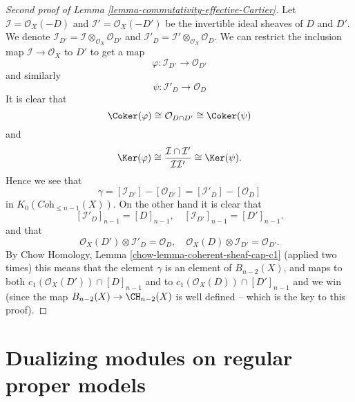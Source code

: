\begin{proof}[Second proof of Lemma \ref{lemma-commutativity-effective-Cartier}]
Let $\mathcal{I} = \mathcal{O}_X(-D)$ and
$\mathcal{I}' = \mathcal{O}_X(-D')$ be the invertible
ideal sheaves of $D$ and $D'$.
We denote
$\mathcal{I}_{D'} = \mathcal{I} \otimes_{\mathcal{O}_X} \mathcal{O}_{D'}$
and
$\mathcal{I}'_D = \mathcal{I}' \otimes_{\mathcal{O}_X} \mathcal{O}_D$.
We can restrict the inclusion map $\mathcal{I} \to \mathcal{O}_X$
to $D'$ to get a map
$$
\varphi : \mathcal{I}_{D'} \longrightarrow \mathcal{O}_{D'}
$$
and similarly
$$
\psi : \mathcal{I}'_D \longrightarrow \mathcal{O}_D
$$
It is clear that
$$
\Coker(\varphi)
\cong
\mathcal{O}_{D \cap D'}
\cong
\Coker(\psi)
$$
and
$$
\Ker(\varphi)
\cong
\frac{\mathcal{I} \cap \mathcal{I}'}{\mathcal{I}\mathcal{I}'}
\cong
\Ker(\psi).
$$
Hence we see that
$$
\gamma =
[\mathcal{I}_{D'}] - [\mathcal{O}_{D'}]
=
[\mathcal{I}'_D] - [\mathcal{O}_D]
$$
in $K_0(\textit{Coh}_{\leq n - 1}(X))$. On the other hand it is clear that
$$
[\mathcal{I}'_D]_{n - 1} = [D]_{n - 1}, \quad
[\mathcal{I}_{D'}]_{n - 1} = [D']_{n - 1}.
$$
and that
$$
\mathcal{O}_X(D') \otimes \mathcal{I}'_D = \mathcal{O}_D, \quad
\mathcal{O}_X(D) \otimes \mathcal{I}_{D'} = \mathcal{O}_{D'}.
$$
By Chow Homology, Lemma \ref{chow-lemma-coherent-sheaf-cap-c1}
(applied two times)
this means that the element $\gamma$ is an element of $B_{n - 2}(X)$, and
maps to both $c_1(\mathcal{O}_X(D')) \cap [D]_{n - 1}$ and to
$c_1(\mathcal{O}_X(D)) \cap [D']_{n - 1}$ and we win (since the
map $B_{n - 2}(X) \to \CH_{n - 2}(X)$ is well defined -- which is
the key to this proof).
\end{proof}











\section{Dualizing modules on regular proper models}
\label{section-dualizing}

